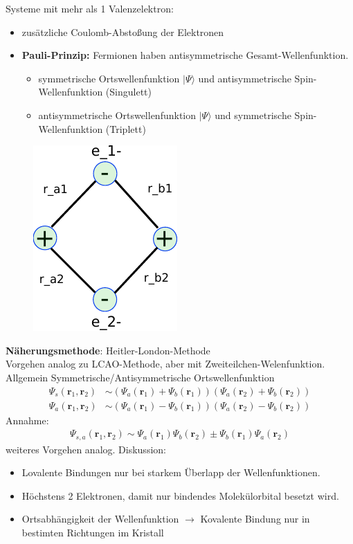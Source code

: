 Systeme mit mehr als 1 Valenzelektron:
\begin{itemize}
	\item zusätzliche Coulomb-Abstoßung der Elektronen
	\item \textbf{Pauli-Prinzip:} Fermionen haben antisymmetrische Gesamt-Wellenfunktion.
	\begin{itemize}
		\item symmetrische Ortswellenfunktion $\vert\Psi\rangle$ und antisymmetrische Spin-Wellenfunktion (Singulett)
		\item antisymmetrische Ortswellenfunktion $\vert\Psi\rangle$ und symmetrische Spin-Wellenfunktion (Triplett)
	\end{itemize}
\end{itemize}
\begin{figure}[]
	\centering
	\includegraphics{figures/1_4H2Moleuel.pdf}
	\caption{}
	\label{}
\end{figure}

\textbf{Näherungsmethode}: Heitler-London-Methode\\
Vorgehen analog zu LCAO-Methode, aber mit Zweiteilchen-Welenfunktion.\\
Allgemein Symmetrische/Antisymmetrische Ortswellenfunktion
\begin{align*}
	\Psi_s(\textbf{r}_1,\textbf{r}_2) &\sim (\Psi_a(\textbf{r}_1) + \Psi_b(\textbf{r}_1)) (\Psi_a(\textbf{r}_2) + \Psi_b (\textbf{r}_2))\\
	\Psi_a(\textbf{r}_1,\textbf{r}_2) &\sim (\Psi_a(\textbf{r}_1) - \Psi_b(\textbf{r}_1)) (\Psi_a(\textbf{r}_2) - \Psi_b (\textbf{r}_2))
\end{align*}
Annahme:
\begin{align*}
	\Psi_{s,a}(\textbf{r}_1,\textbf{r}_2) \sim \Psi_a(\textbf{r}_1) \Psi_b (\textbf{r}_2) \pm \Psi_b (\textbf{r}_1) \Psi_a (\textbf{r}_2)
\end{align*}
weiteres Vorgehen analog.
Diskussion:
\begin{itemize}
	\item Lovalente Bindungen nur bei starkem Überlapp der Wellenfunktionen.
	\item Höchstens 2 Elektronen, damit nur bindendes Molekülorbital besetzt wird.
	\item Ortsabhängigkeit der Wellenfunktion $\rightarrow$ Kovalente Bindung nur in bestimten Richtungen im Kristall
\end{itemize}

